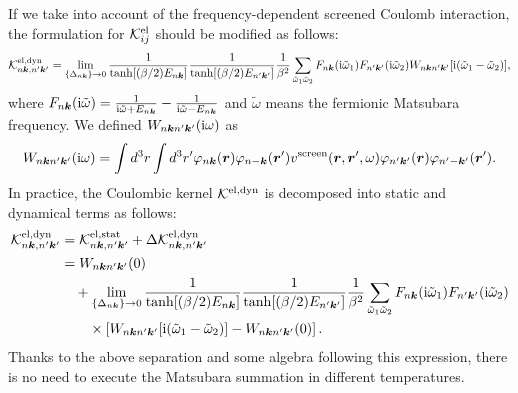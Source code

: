 %
If we take into account of the frequency-dependent screened Coulomb interaction,
the formulation for ${\mathcal K}^{\rm el}_{ij}$ should be modified as follows\cite{RA2013}:
%
\begin{equation}
	{\mathcal K}^{\rm el, dyn}_{n\bm k,n'\bm k'} = 
	\lim_{\{\Delta_{n\bm k}\} \to 0}
	\frac{1}{\tanh[(\beta/2)E_{n\bm k}]}\frac{1}{\tanh[(\beta/2)E_{n'\bm k'}]}
	\frac{1}{\beta^2}
	\sum_{\tilde{\omega}_1\tilde{\omega}_2}
	F_{n\bm k}({\rm i}\tilde\omega_1)F_{n'\bm k'}({\rm i}\tilde\omega_2)
	W_{n\bm kn'\bm k'}[{\rm i}(\tilde\omega_1 - \tilde\omega_2)],
	\label{eq:Keldyn}
\end{equation}
%
where $F_{n\bm k}({\rm i}\tilde\omega) = 
\frac{1}{ {\rm i} \tilde\omega + E_{n\bm k}}-\frac{1}{ {\rm i} \tilde\omega - E_{n\bm k}}$
and $\tilde\omega$ means the fermionic Matsubara frequency. We defined 
$W_{n\bm kn'\bm k'}({\rm i}\omega)$ as 
%
\begin{equation}
	W_{n\bm kn'\bm k'}({\rm i}\omega) = 
	\int d^3r \int d^3r' \varphi_{n\bm k}(\bm r)\varphi_{n-\bm k}({\bm r'})
	v^{\rm screen}(\bm r, {\bm r'}, \omega) \varphi_{n'\bm k'}(\bm r) \varphi_{n'-\bm k'}({\bm r'}).
	\label{eq:dynWnknk}
\end{equation}
%
In practice, the Coulombic kernel $\mathcal K^{\rm el,dyn}$ is decomposed into static and dynamical
terms as follows\cite{RAphD}:
%
\begin{equation}
	\begin{split}
	{\mathcal K}^{\rm el, dyn}_{n\bm k,n'\bm k'} &={\mathcal K}^{\rm el,stat}_{n\bm k,n'\bm k'} 
	+ \Delta{\mathcal K}^{\rm el, dyn}_{n\bm k,n'\bm k'} \\
	&= W_{n\bm k n' \bm k'}(0)  \\
	&\quad +
	\lim_{\{\Delta_{n\bm k}\} \to 0}
	\frac{1}{\tanh[(\beta/2)E_{n\bm k}]}\frac{1}{\tanh[(\beta/2)E_{n'\bm k'}]}
	\frac{1}{\beta^2}
	\sum_{\tilde{\omega}_1\tilde{\omega}_2}
	F_{n\bm k}({\rm i}\tilde\omega_1)F_{n'\bm k'}({\rm i}\tilde\omega_2) \\
	&\quad \quad \times
	\left[ 
		W_{n\bm kn'\bm k'}[{\rm i}(\tilde\omega_1 - \tilde\omega_2)] - W_{n\bm k n' \bm k'}(0)
	\right].
	\label{eq:Kelsep}
\end{split}
\end{equation}
%
Thanks to the above separation and some algebra following this expression, 
there is no need to execute the Matsubara summation in different temperatures\cite{RAphD}.
